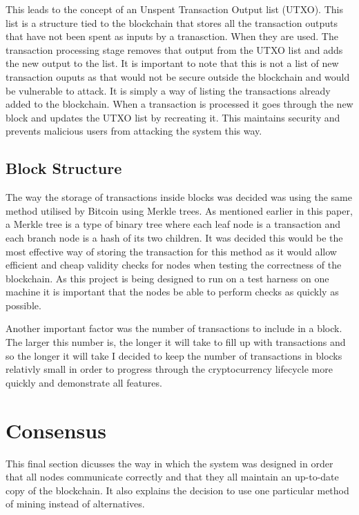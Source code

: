 \documentclass{l4proj}
\begin{document}
This leads to the concept of an Unspent Transaction Output list (UTXO). This list is a structure tied to the blockchain
that stores all the transaction outputs that have not been spent as inputs by a tranasction. When they are used.
The transaction processing stage removes that output from the UTXO list and adds the new output to the list.
It is important to note that this is not a list of new transaction ouputs as that would not be secure outside the
blockchain and would be vulnerable to attack. It is simply a way of listing the transactions already added to the
blockchain. When a transaction is processed it goes through the new block and updates the UTXO list by recreating 
it. This maintains security and prevents malicious users from attacking the system this way.

\subsection{Block Structure}
The way the storage of transactions inside blocks was decided was using the same method utilised by Bitcoin using
Merkle trees. As mentioned earlier in this paper, a Merkle tree is a type of binary tree where each leaf node
is a transaction and each branch node is a hash of its two children. It was decided this would be the most effective
way of storing the transaction for this method as it would allow efficient and cheap validity checks for nodes
when testing the correctness of the blockchain. As this project is being designed to run on a test harness on one
machine it is important that the nodes be able to perform checks as quickly as possible.

Another important factor was the number of transactions to include in a block. The larger this number is, the
longer it will take to fill up with transactions and so the longer it will take I decided to keep the 
number of transactions in blocks relativly small in order to progress through the cryptocurrency lifecycle
more quickly and demonstrate all features.

\section{Consensus}
This final section dicusses the way in which the system was designed in order that all nodes communicate correctly and
that they all maintain an up-to-date copy of the blockchain. It also explains the decision to 
use one particular method of mining instead of alternatives.
\end{document}
